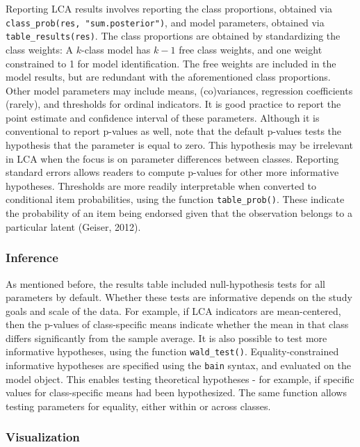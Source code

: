 \documentclass[
  ,man,floatsintext]{apa6}
\begin{document}
Reporting LCA results involves reporting the class proportions,
obtained via \texttt{class\_prob(res,\ "sum.posterior")},
and model parameters, obtained via \texttt{table\_results(res)}.
The class proportions are obtained by standardizing the class weights:
A \(k\)-class model has \(k-1\) free class weights,
and one weight constrained to 1 for model identification.
The free weights are included in the model results,
but are redundant with the aforementioned class proportions.
Other model parameters may include means, (co)variances, regression coefficients (rarely), and thresholds for ordinal indicators.
It is good practice to report the point estimate and confidence interval of these parameters.
Although it is conventional to report p-values as well,
note that the default p-values tests the hypothesis that the parameter is equal to zero.
This hypothesis may be irrelevant in LCA when the focus is on parameter differences between classes.
Reporting standard errors allows readers to compute p-values for other more informative hypotheses.
Thresholds are more readily interpretable when converted to conditional item probabilities, using the function \texttt{table\_prob()}.
These indicate the probability of an item being
endorsed given that the observation belongs to a particular latent (Geiser, 2012).

\hypertarget{inference}{%
\subsubsection{Inference}\label{inference}}

As mentioned before, the results table included null-hypothesis tests for all parameters by default.
Whether these tests are informative depends on the study goals and scale of the data.
For example, if LCA indicators are mean-centered,
then the p-values of class-specific means indicate whether the mean in that class differs significantly from the sample average.
It is also possible to test more informative hypotheses,
using the function \texttt{wald\_test()}.
Equality-constrained informative hypotheses are specified using the \texttt{bain} syntax,
and evaluated on the model object.
This enables testing theoretical hypotheses - for example, if specific values for class-specific means had been hypothesized.
The same function allows testing parameters for equality, either within or across classes.

\hypertarget{visualization}{%
\subsubsection{Visualization}\label{visualization}}
\end{document}
